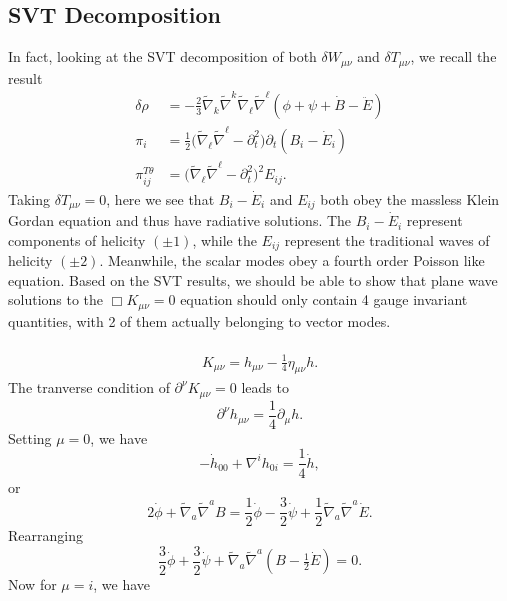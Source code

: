\documentclass[10pt,letterpaper]{article}
\numberwithin{equation}{subsection}
\begin{document}
\subsection{SVT Decomposition}
In fact, looking at the SVT decomposition of both $\delta W_{\mu\nu}$ and $\delta T_{\mu\nu}$, we recall the result
\begin{align}
\delta \rho &=  -\frac{2}{3}\tilde{\nabla}_k\tilde{\nabla}^k\tilde{\nabla}_{\ell}\tilde{\nabla}^\ell(\phi + \psi +\dot{B}-\ddot{E})\nonumber\\
\pi_i &=  \frac12\big( \tilde\nabla_\ell \tilde\nabla^\ell - \partial_t^2\big) \partial_t (B_i - \dot{E}_i)\nonumber\\
\pi_{ij}^{T\theta} &=  \big(\tilde{\nabla}_\ell\tilde{\nabla}^\ell-\partial_t^2\big)^2E_{ij}.
\end{align}
Taking $\delta T_{\mu\nu} = 0$, here we see that $B_i - \dot E_i$ and $E_{ij}$ both obey the massless Klein Gordan equation and thus have radiative solutions. The $B_i - \dot E_i$ represent components of helicity $(\pm 1)$, while the $E_{ij}$ represent the traditional waves of helicity $(\pm 2)$. Meanwhile, the scalar modes obey a fourth order Poisson like equation. Based on the SVT results, we should be able to show that plane wave solutions to the $\Box K_{\mu\nu} = 0$ equation should only contain 4 gauge invariant quantities, with 2 of them actually belonging to vector modes. 
\\ \\
\begin{align}
K_{\mu\nu} = h_{\mu\nu} - \frac14 \eta_{\mu\nu} h.
\end{align}
The tranverse condition of $\partial^\nu K_{\mu\nu} = 0$ leads to
\begin{equation}
\partial^\nu h_{\mu\nu} = \frac14 \partial_\mu h.
\end{equation}
Setting $\mu = 0$, we have
\begin{equation}
-\dot h_{00} + \nabla^i h_{0i} = \frac14 \dot h,
\end{equation}
or
\begin{equation}
2\dot \phi + \tilde\nabla_a \tilde\nabla^a B = \frac12 \dot\phi - \frac32\dot \psi + \frac12  \tilde{\nabla}_{a}\tilde{\nabla}^{a}\dot E.
\end{equation}
Rearranging
\begin{equation}
\frac32 \dot \phi + \frac32 \dot \psi +  \tilde{\nabla}_{a}\tilde{\nabla}^{a}( B - \tfrac12 \dot E) = 0.
\end{equation}
Now for $\mu =i$, we have
\end{document}
